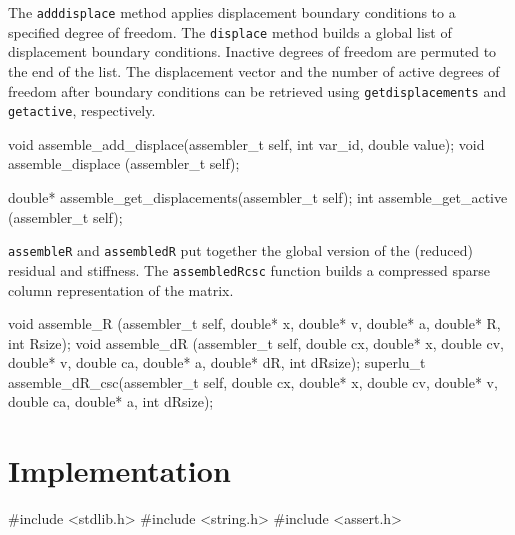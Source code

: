 The {\tt{}add{}displace} method applies displacement boundary conditions
to a specified degree of freedom.  The {\tt{}displace} method builds
a global list of displacement boundary conditions.  Inactive degrees
of freedom are permuted to the end of the list.
The displacement vector and the number of active degrees of 
freedom after boundary conditions can be retrieved using 
{\tt{}get{}displacements} and {\tt{}get{}active}, respectively.

\nwenddocs{}\plusendmoddef
void    assemble_add_displace(assembler_t self, int var_id, double value);
void    assemble_displace    (assembler_t self);

double* assemble_get_displacements(assembler_t self);
int     assemble_get_active       (assembler_t self);

\nwendcode{}\nwdocspar

{\tt{}assemble{}R} and {\tt{}assemble{}dR} put together the global version
of the (reduced) residual and stiffness.   The {\tt{}assemble{}dR{}csc} function
builds a compressed sparse column representation of the matrix.

\nwenddocs{}\plusendmoddef
void assemble_R   (assembler_t self, double* x, double* v, double* a,
                   double* R, int Rsize);
void assemble_dR  (assembler_t self,
                   double cx, double* x, 
                   double cv, double* v, 
                   double ca, double* a, 
                   double* dR,
                   int dRsize);
superlu_t assemble_dR_csc(assembler_t self,
                          double cx, double* x, 
                          double cv, double* v, 
                          double ca, double* a,
                          int dRsize);

\nwendcode{}\nwdocspar


\section{Implementation}

\nwenddocs{}\endmoddef
#include <stdlib.h>
#include <string.h>
#include <assert.h>


